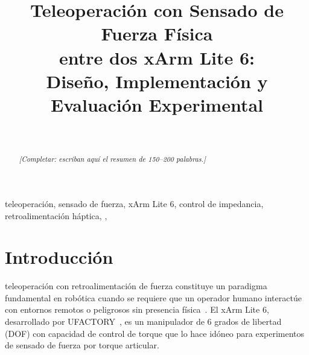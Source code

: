 \documentclass[journal,10pt,twoside]{IEEEtran}
\newcommand{\answerline}[1][3cm]{\underline{\hspace{#1}}}
\begin{document}
\title{Teleoperación con Sensado de Fuerza Física\\
  entre dos xArm Lite 6:\\
  Diseño, Implementación y Evaluación Experimental}

\author{%
  \\
}

\maketitle

\begin{abstract}
\textit{[Completar: escriban aquí el resumen de 150--200 palabras.]}
\end{abstract}

\begin{IEEEkeywords}
  teleoperación, sensado de fuerza, xArm Lite 6, control de impedancia,
  retroalimentación háptica, \answerline[2cm], \answerline[2cm]
\end{IEEEkeywords}

\section{Introducción}

 teleoperación con retroalimentación de fuerza
constituye un paradigma fundamental en robótica cuando se requiere que
un operador humano interactúe con entornos remotos o peligrosos sin
presencia física~\cite{murray1994}. El xArm Lite 6, desarrollado por
UFACTORY~\cite{xarm_github}, es un manipulador de 6 grados de libertad
(DOF) con capacidad de control de torque que lo hace idóneo para experimentos
de sensado de fuerza por torque articular.
\end{document}
